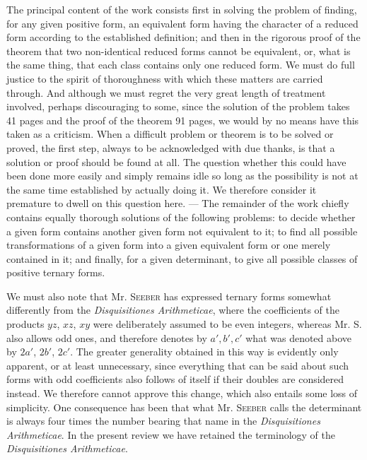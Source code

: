 The principal content of the work consists first in solving the problem of finding, for any given positive form, an equivalent form having the character of a reduced form according to the established definition; and then in the rigorous proof of the theorem that two non-identical reduced forms cannot be equivalent, or, what is the same thing, that each class contains only one reduced form. We must do full justice to the spirit of thoroughness with which these matters are carried through. And although we must regret the very great length of treatment involved, perhaps discouraging to some, since the solution of the problem takes 41 pages and the proof of the theorem 91 pages, we would by no means have this taken as a criticism. When a difficult problem or theorem is to be solved or proved, the first step, always to be acknowledged with due thanks, is that a solution or proof should be found at all. The question whether this could have been done more easily and simply remains idle so long as the possibility is not at the same time established by actually doing it. We therefore consider it premature to dwell on this question here. --- The remainder of the work chiefly contains equally thorough solutions of the following problems: to decide whether a given form contains another given form not equivalent to it; to find all possible transformations of a given form into a given equivalent form or one merely contained in it; and finally, for a given determinant, to give all possible classes of positive ternary forms.

We must also note that Mr. \textsc{Seeber} has expressed ternary forms somewhat differently from the \emph{Disquisitiones Arithmeticae}, where the coefficients of the products $yz$, $xz$, $xy$ were deliberately assumed to be even integers, whereas Mr. S. also allows odd ones, and therefore
denotes by $a',b',c'$ what was denoted above by $2a'$, $2b'$, $2c'$. The greater generality obtained in this way is evidently only apparent, or at least unnecessary, since everything that can be said about such forms with odd coefficients also follows of itself if their doubles are considered instead. We therefore cannot approve this change, which also entails some loss of simplicity. One consequence has been that what Mr. \textsc{Seeber} calls the determinant is always four times the number bearing that name in the \emph{Disquisitiones Arithmeticae}. In the present review we have retained the terminology of the \emph{Disquisitiones Arithmeticae}.

